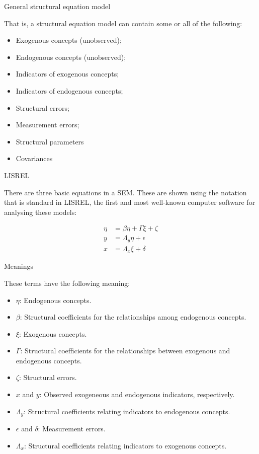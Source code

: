 \documentclass[10pt,ignorenonframetext,]{beamer}
\providecommand{\tightlist}{%
\setlength{\itemsep}{0pt}\setlength{\parskip}{0pt}}
\begin{document}
\begin{frame}{General structural equation model}

That is, a structural equation model can contain some or all of the
following:

\begin{itemize}
\tightlist
\item
  Exogenous concepts (unobserved);
\item
  Endogenous concepts (unobserved);
\item
  Indicators of exogenous concepts;
\item
  Indicators of endogenous concepts;
\item
  Structural errors;
\item
  Measurement errors;
\item
  Structural parameters
\item
  Covariances
\end{itemize}

\end{frame}

\begin{frame}{LISREL}

There are three basic equations in a SEM. These are shown using the
notation that is standard in LISREL, the first and most well-known
computer software for analysing these models:

\[
\begin{aligned}
\eta &= \beta \eta + \Gamma \xi + \zeta\\
y &= \Lambda_y \eta  + \epsilon \\
x &= \Lambda_x \xi + \delta
\end{aligned}
\]

\end{frame}

\begin{frame}{Meanings}

\small
These terms have the following meaning:

\begin{itemize}
\tightlist
\item
  \(\eta\): Endogenous concepts.
\item
  \(\beta\): Structural coefficients for the relationships among
  endogenous concepts.
\item
  \(\xi\): Exogenous concepts.
\item
  \(\Gamma\): Structural coefficients for the relationships between
  exogenous and endogenous concepts.
\item
  \(\zeta\): Structural errors.
\item
  \(x\) and \(y\): Observed exogeneous and endogenous indicators,
  respectively.
\item
  \(\Lambda_y\): Structural coefficients relating indicators to
  endogenous concepts.
\item
  \(\epsilon\) and \(\delta\): Measurement errors.
\item
  \(\Lambda_x\): Structural coefficients relating indicators to
  exogenous concepts.
\end{itemize}

\end{frame}
\end{document}
